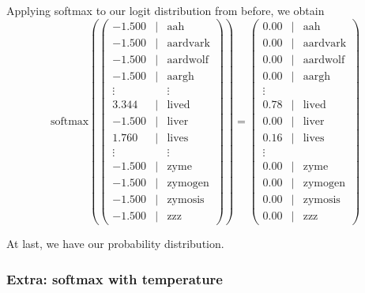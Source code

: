 \documentclass{article}
\begin{document}
Applying softmax to our logit distribution from before, we obtain
$$
\text{softmax}\left(\begin{pmatrix}
    -1.500 & | & \text{aah} \\
    -1.500 & | & \text{aardvark} \\
    -1.500 & | & \text{aardwolf} \\
    -1.500 & | & \text{aargh} \\
    \vdots &   & \vdots \\
     3.344 & | & \text{lived} \\
    -1.500 & | & \text{liver} \\
     1.760 & | & \text{lives} \\
    \vdots &   & \vdots \\
    -1.500 & | & \text{zyme} \\
    -1.500 & | & \text{zymogen} \\
    -1.500 & | & \text{zymosis} \\
    -1.500 & | & \text{zzz}
\end{pmatrix}\right)
=
\begin{pmatrix}
    0.00 & | & \text{aah} \\
    0.00 & | & \text{aardvark} \\
    0.00 & | & \text{aardwolf} \\
    0.00 & | & \text{aargh} \\
    \vdots \\
    0.78 & | & \text{lived} \\
    0.00 & | & \text{liver} \\
    0.16 & | & \text{lives} \\
    \vdots \\
    0.00 & | & \text{zyme} \\
    0.00 & | & \text{zymogen} \\
    0.00 & | & \text{zymosis} \\
    0.00 & | & \text{zzz}
\end{pmatrix}
$$

At last, we have our probability distribution.

\subsubsection*{Extra: softmax with temperature}
\end{document}
